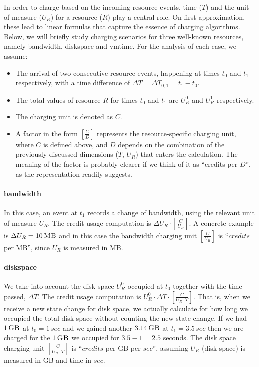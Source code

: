 \documentclass[letterpaper,twocolumn,10pt]{article}
\newcommand{\DTime}{\ensuremath{T}\xspace} %
\newcommand{\DUnitR}{\ensuremath{U_{R}}\xspace} %
\newcommand{\MB}[1]{\ensuremath{#1\,\mbox{\sc MB}}}
\newcommand{\GB}[1]{\ensuremath{#1\,\mbox{\sc GB}}}
\newcommand{\secs}[1]{\ensuremath{#1\,sec}}
\begin{document}
In order to charge based on the incoming resource events, time (\DTime) and the unit of measure (\DUnitR) for a resource ($R$) play a central role. On first approximation, these lead to linear formulas that capture the essence of charging algorithms. Below, we will briefly  study charging scenarios for three well-known resources, namely \textsf{bandwidth}, \textsf{diskspace} and \textsf{vmtime}. For the analysis of each case, we assume: 
\begin{itemize}
\item The arrival of two consecutive resource events, happening at times $t_0$ and $t_1$ respectively, with a time difference of  $\Delta T = \Delta T_{0, 1} = t_1 - t_0$.

\item The total values of resource $R$ for times $t_0$ and $t_1$ are $U_R^0$ and $U_R^1$ respectively.

\item The charging unit is denoted as $C$.

\item A factor in the form $[\frac{C}{D}]$ represents the resource-specific charging unit, where $C$ is defined above, and $D$ depends on the combination of the previously discussed dimensions ($T$, $U_R$) that enters the calculation. The meaning of the factor is probably clearer if we think of it as ``credits per $D$'', as the representation readily suggests.
\end{itemize}

\paragraph{\textsf{bandwidth}}
In this case, an event at $t_1$ records a change of bandwidth, using the relevant unit of measure $U_R$.  The credit usage computation is $\Delta U_R \cdot  [ \frac{C}{U_R} ]$.
A concrete example is $\Delta U_R = \MB{10}$ and in this case the bandwidth charging unit $[ \frac{C}{U_R} ]$ is ``$credits$ per {\sc MB}'', since $U_R$ is measured in {\sc MB}.

\paragraph{\textsf{diskspace}}
We take into account the disk space $U_R^0$ occupied at $t_0$ together with the time passed, $\Delta T$. The credit usage computation is $U_R^{0} \cdot \Delta T \cdot [ \frac{C}{U_R \cdot T} ]$.
That is, when we receive a new state change for disk space, we actually calculate for how long we occupied the total disk space without counting the new state change. If we had \GB{1} at $t_0 = \secs{1}$ and we gained another \GB{3.14} at $t_1 = \secs{3.5}$ then we are charged for the \GB{1} we occupied for $3.5 - 1 = 2.5$ seconds. The disk space charging unit $[ \frac{C}{U_R \cdot T} ]$ is ``$credits$ per {\sc GB} per $sec$'', assuming $U_R$ (disk space) is measured in {\sc GB} and time in $sec$.
\end{document}
